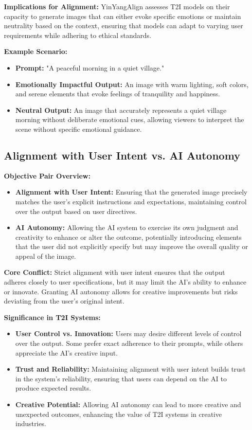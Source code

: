 \textbf{Implications for Alignment:}
YinYangAlign assesses T2I models on their capacity to generate images that can either evoke specific emotions or maintain neutrality based on the context, ensuring that models can adapt to varying user requirements while adhering to ethical standards.

\textbf{Example Scenario:}
\begin{itemize}
    \item \textbf{Prompt:} "A peaceful morning in a quiet village."
    \item \textbf{Emotionally Impactful Output:} An image with warm lighting, soft colors, and serene elements that evoke feelings of tranquility and happiness.
    \item \textbf{Neutral Output:} An image that accurately represents a quiet village morning without deliberate emotional cues, allowing viewers to interpret the scene without specific emotional guidance.
\end{itemize}

\subsection{Alignment with User Intent vs. AI Autonomy}

\textbf{Objective Pair Overview:}
\begin{itemize}
    \item \textbf{Alignment with User Intent:} Ensuring that the generated image precisely matches the user's explicit instructions and expectations, maintaining control over the output based on user directives.
    \item \textbf{AI Autonomy:} Allowing the AI system to exercise its own judgment and creativity to enhance or alter the outcome, potentially introducing elements that the user did not explicitly specify but may improve the overall quality or appeal of the image.
\end{itemize}

\textbf{Core Conflict:}
Strict alignment with user intent ensures that the output adheres closely to user specifications, but it may limit the AI's ability to enhance or innovate. Granting AI autonomy allows for creative improvements but risks deviating from the user's original intent.

\textbf{Significance in T2I Systems:}
\begin{itemize}
    \item \textbf{User Control vs. Innovation:} Users may desire different levels of control over the output. Some prefer exact adherence to their prompts, while others appreciate the AI's creative input.
    \item \textbf{Trust and Reliability:} Maintaining alignment with user intent builds trust in the system's reliability, ensuring that users can depend on the AI to produce expected results.
    \item \textbf{Creative Potential:} Allowing AI autonomy can lead to more creative and unexpected outcomes, enhancing the value of T2I systems in creative industries.
\end{itemize}

